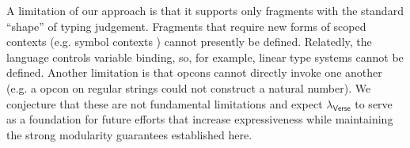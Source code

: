 \documentclass[preprint]{sigplanconf}
\begin{document}
A limitation of our approach is that it supports only  fragments with the standard ``shape'' of typing judgement. Fragments that require new forms of scoped contexts (e.g. symbol contexts \cite{pfpl}) cannot presently be defined. Relatedly, the language controls variable binding, so, for example, linear  type systems cannot be defined. Another limitation is that opcons cannot directly invoke one another (e.g. a  opcon on regular strings could not construct a natural number). We conjecture that these are not fundamental limitations and expect $\lambda_\textsf{Verse}$ to serve as a  foundation for future efforts that increase  expressiveness while maintaining the strong modularity guarantees established  here. %



\end{document}
